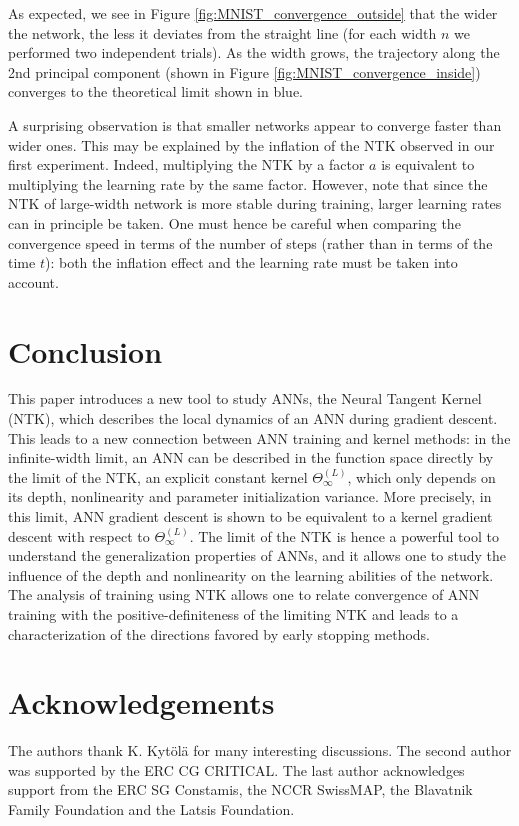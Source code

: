 \documentclass{article}
\begin{document}
As expected, we see in Figure \ref{fig:MNIST_convergence_outside} that the wider the network, the less it deviates from the straight line (for each width $n$ we performed two independent trials). As the width grows, the trajectory along the 2nd principal component (shown in Figure \ref{fig:MNIST_convergence_inside}) converges to the theoretical limit shown in blue.

A surprising observation is that smaller networks appear to converge faster than wider ones. This may be explained by the inflation of the NTK observed in our first experiment. Indeed, multiplying the NTK by a factor $a$ is equivalent to multiplying the learning rate by the same factor. However, note that since the NTK of large-width network is more stable during training, larger learning rates can in principle be taken. One must hence be careful when comparing the convergence speed in terms of the number of steps (rather than in terms of the time $t$): both the inflation effect and the learning rate must be taken into account.

\section{Conclusion}
This paper introduces a new tool to study ANNs, the Neural Tangent Kernel (NTK), which describes the local dynamics of an ANN during gradient descent. This leads to a new connection between ANN training and kernel methods: in the infinite-width limit, an ANN can be described in the function space directly by the limit of the NTK, an explicit constant kernel $\Theta^{(L)}_\infty$, which only depends on its depth, nonlinearity and parameter initialization variance. More precisely, in this limit, ANN gradient descent is shown to be equivalent to a kernel gradient descent with respect to $\Theta^{(L)}_\infty$. The limit of the NTK is hence a powerful tool to understand the generalization properties of ANNs, and it allows one to study the influence of the depth and nonlinearity on the learning abilities of the network. The analysis of training using NTK allows one to relate convergence of ANN training with the positive-definiteness of the limiting NTK and leads to a characterization of the directions favored by early stopping methods.

\section*{Acknowledgements}
The authors thank K. Kyt\"ol\"a for many interesting discussions. The second author was supported by the ERC CG CRITICAL. The last author acknowledges support from the ERC SG Constamis, the NCCR SwissMAP, the Blavatnik Family Foundation and the Latsis Foundation. 
\end{document}
